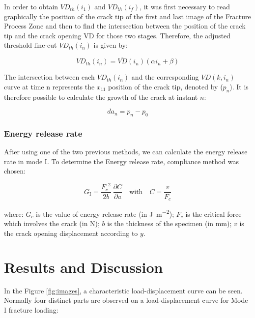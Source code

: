 \documentclass[3p,times,procedia]{elsarticle}
\begin{document}
\noindent In order to obtain $VD_{th}(i_1)$ and $VD_{th}(i_f)$, it was first necessary to read graphically the position of the crack tip of the first and last image of the Fracture Process Zone and then to find the intersection between the position of the crack tip and the crack opening VD for those two stages. Therefore, the adjusted threshold line-cut $VD_{th}(i_n)$ is given by:

\begin{equation}
	VD_{th}(i_n)=\overline{VD}(i_n)(\alpha i_n +\beta)
	\label{eq:eq26}
\end{equation}

The intersection between each $VD_{th}(i_n)$ and the corresponding $VD(k, i_n)$ curve at time n represents the $x_{11}$ position of the crack tip, denoted by ($p_n$).
It is therefore possible to calculate the growth of the crack at instant $n$:

\begin{equation}
	da_n=p_n-p_0
	\label{eq:eq27}
\end{equation}

\subsubsection{Energy release rate}

After using one of the two previous methods, we can calculate the energy release rate in mode I. To determine the Energy release rate, compliance method was chosen:

\begin{equation}
	G_\text{I}=\displaystyle\frac{{F_{c}}^2}{2b}\ \frac{\partial C}{\partial a} \quad \text{with} \quad C=\frac{v}{F_{c}} 	
	\label{eq:Energy release rate equation}
\end{equation} 
 
\noindent where: $G_c$ is the value of energy release rate (in \si{\joule\per\square\meter}); $F_c$ is the critical force which involves the crack (in \si{\newton}); $b$ is the thickness of the specimen (in \si{\milli\meter}); $v$ is the crack opening displacement according to $y$.


\section{Results and Discussion}\label{S:res}


In the Figure \ref{fig:images}, a characteristic load-displacement curve can be seen. Normally four distinct parts are observed on a load-displacement curve for Mode I fracture loading:
\end{document}

